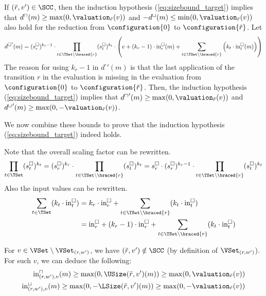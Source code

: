 If $(\tilde{r}, v') \in \SCC$, then the induction hypothesis (\ref{eq:sizebound_target}) implies that $d^\sqcap(m) \geq \max(0, \valuation_{\tilde{r}}(v))$ and $-d^\sqcup(m) \leq \min(0, \valuation_{\tilde{r}}(v))$ also hold for the reduction from $\configuration{0}$ to $\configuration{\tilde{r}}$.
Let
\begin{equation} \label{eq:induction_consequence}
  {d^\square}'(m) = (s^\square_r)^{k_r - 1} \cdot \prod_{t \in \TSet \setminus \braced{r}} (s^\square_t)^{k_t} \cdot \left( e + \left( k_r - 1 \right) \cdot \text{in}^\square_r(m) + \sum_{t \in \TSet \setminus \braced{r}} \left( k_t \cdot \text{in}^\square_t(m) \right) \right)
\end{equation}
The reason for using $k_r - 1$ in ${d^\square}'(m)$ is that the last application of the transition $r$ in the evaluation is missing in the evaluation from $\configuration{0}$ to $\configuration{\tilde{r}}$.
Then, the induction hypothesis (\ref{eq:sizebound_target}) implies that ${d^\sqcap}'(m) \geq \max(0, \valuation_{\tilde{r}}(v))$ and ${d^\sqcup}'(m) \geq \max(0, -\valuation_{\tilde{r}}(v))$.

We now combine these bounds to prove that the induction hypothesis (\ref{eq:sizebound_target}) indeed holds.

Note that the overall scaling factor can be rewritten.
\begin{equation} \label{eq:scaling_factor_reduction}
  \prod_{t \in \TSet} (s^\square_t)^{k_t} = (s^\square_r)^{k_r} \cdot \prod_{t \in \TSet \setminus \braced{r}} (s^\square_t)^{k_t} = s^\square_r \cdot (s^\square_r)^{k_r - 1} \cdot \prod_{t \in \TSet \setminus \braced{r}} (s^\square_t)^{k_t}
\end{equation}
Also the input values can be rewritten.
\begin{equation} \label{eq:input_reduction}
  \begin{split}
  \sum_{t \in \TSet} (k_t \cdot \text{in}^\square_t)
  & = k_r \cdot \text{in}^\square_r + \sum_{t \in \TSet \setminus \braced{r}} (k_t \cdot \text{in}^\square_t) \\
  & = \text{in}^\square_r
    + (k_r - 1) \cdot \text{in}^\square_r
    + \sum_{t \in \TSet \setminus \braced{r}} (k_t \cdot \text{in}^\square_t)
  \end{split}
\end{equation}

For $v \in \VSet \setminus \VSet_{(r, w')}$, we have $(\tilde{r}, v') \notin \SCC$ (by definition of $\VSet_{(r, w')}$).
For such $v$, we can deduce the following:
\begin{equation} \label{eq:input_rv_var_reduction}
  \begin{split}
    \text{in}^\sqcap_{(r, w'),{v}}(m) \geq \max (0, \USize(\tilde{r}, v')(m)) \geq \max (0, \valuation_{\tilde{r}}(v)) \\
    \text{in}^\sqcup_{(r, w'),{v}}(m) \geq \max (0, -\LSize(\tilde{r}, v')(m)) \geq \max (0, -\valuation_{\tilde{r}}(v))
  \end{split}
\end{equation}

